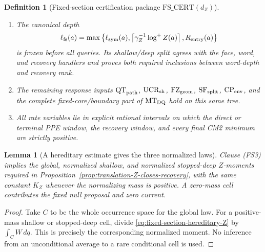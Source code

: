 \documentclass[11pt]{article}
\newtheorem{lemma}[theorem]{Lemma}
\newtheorem{definition}[theorem]{Definition}
\begin{document}
\begin{definition}[Fixed-section certification package
$\mathrm{FS\_CERT}(d_Z)$]
\begin{enumerate}[label=\textup{(FS\arabic*)}]
continuation and finite-frequency uniformity give \textup{(PPE3)--(PPE4)}
on the identical stopped tree.
\item The canonical depth
\begin{equation}
 \ell_{\rm fs}(a)=\max\left\{\ell_{\rm sym}(a),
 \left\lceil\gamma_Z^{-1}\log^+Z(a)\right\rceil,
 R_{\rm entry}(a)\right\}
\label{eq:fixed-section-canonical-depth}
\end{equation}
is frozen before all queries.  Its shallow/deep split agrees with the face,
word, and recovery handlers and proves both required inclusions between
word-depth and recovery rank.
\item The remaining response inputs
$\mathrm{QT}_{\rm path}$, $\mathrm{UCR}_{\rm sh}$,
$\mathrm{FZ}_{\rm geom}$, $\mathrm{SF}_{\rm split}$,
$\mathrm{CP}_{\rm env}$, and the complete fixed-core/boundary part of
$\mathrm{MT}_{\rm DQ}$ hold on this same tree.
\item All rate variables lie in explicit rational intervals on which the
direct or terminal PPE window, the recovery window, and every final CM2
minimum are strictly positive.
\end{enumerate}
\end{definition}

\begin{lemma}[A hereditary estimate gives the three normalized laws]
\label{lem:fixed-section-hereditary-Z}
Clause \textup{(FS3)} implies the global, normalized shallow, and normalized
stopped-deep $Z$-moments required in
Proposition~\ref{prop:translation-Z-closes-recovery}, with the same constant
$K_Z$ whenever the normalizing mass is positive.  A zero-mass cell contributes
the fixed null proposal and zero current.
\end{lemma}

\begin{proof}
Take $C$ to be the whole occurrence space for the global law.  For a
positive-mass shallow or stopped-deep cell, divide
\eqref{eq:fixed-section-hereditary-Z} by $\int_CW\,dq$.  This is precisely
the corresponding normalized moment.  No inference from an unconditional
average to a rare conditional cell is used.
\end{proof}
\end{document}
